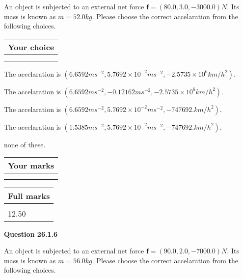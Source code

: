 \documentclass[12pt]{article}
\begin{document}
An object is subjected to an external net force $\mathbf{f}=(
80.0 ,
3.0,
-3000.0  )N$. Its mass is known as
$m= %
52.0  kg$. Please choose the correct accelaration
from the following choices.
 
  
  
\noindent\hspace{3.0in} \begin{tabular}{|l|}
\hline
Your choice \\
\hline
 \\ 
 \\ 
\hline
\end{tabular}
  
  
 
 
The accelaration is
$(
6.6592ms^{-2},
5.7692 \times 10^{-2}ms^{-2},
-2.5735 \times 10^{6}km/h^2
).
$
 
 
The accelaration is
$(
6.6592ms^{-2},
-0.12162ms^{-2},
-2.5735 \times 10^{6}km/h^2
).
$
 
 
The accelaration is
$(
6.6592ms^{-2},
5.7692 \times 10^{-2}ms^{-2},
-747692.km/h^2
).
$
 
 
The accelaration is
$(
1.5385ms^{-2},
5.7692 \times 10^{-2}ms^{-2},
-747692.km/h^2
).
$
 
 
none of these.
 
 
 
 

 
\vspace{0.3in}
  
\vspace{0.2in}
  
         \begin{tabular}{|l|}
\hline
 Your marks  \\
\hline
 \\ 
 \\ 
\hline
\end{tabular}
\hspace{0.05in} \begin{tabular}{|l|}
\hline
 Full marks  \\
\hline
 \\ 
12.50 \\
\hline
\end{tabular}
{\textbf{\Large{Question
26.1.6 
}}}
  
  
 
An object is subjected to an external net force $\mathbf{f}=(
90.0 ,
2.0,
-7000.0  )N$. Its mass is known as
$m= %
56.0  kg$. Please choose the correct accelaration
from the following choices.
 
\end{document}
